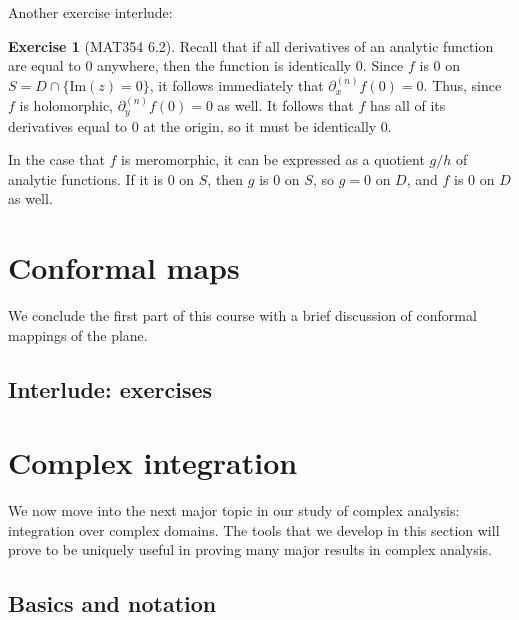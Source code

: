 \documentclass[aps,pra,showpacs,notitlepage,onecolumn,superscriptaddress,nofootinbib]{revtex4-1}
\theoremstyle{definition}
\newtheorem{exercise}{Exercise}[section]
\newcommand{\hhrulefill}{\hspace{-1.5em} \hrulefill}
\begin{document}
\noindent Another exercise interlude:

\hhrulefill

\begin{exercise}[MAT354 6.2]
  Recall that if all derivatives of an analytic function are equal to $0$ anywhere, then the function is identically $0$. Since $f$ is $0$ on $S = D \cap \{\text{Im}(z) = 0\}$,
  it follows immediately that $\partial_x^{(n)} f(0) = 0$. Thus, since $f$ is holomorphic, $\partial_y^{(n)} f(0) = 0$ as well. It follows that $f$ has all of its derivatives
  equal to $0$ at the origin, so it must be identically $0$.
  \newline

  \noindent In the case that $f$ is meromorphic, it can be expressed as a quotient $g/h$ of analytic functions. If it is $0$ on $S$, then $g$ is $0$ on $S$, so
  $g = 0$ on $D$, and $f$ is $0$ on $D$ as well.
  \end{exercise}

\hhrulefill

\section{Conformal maps}

\noindent We conclude the first part of this course with a brief discussion of conformal mappings of the plane.

\subsection{Interlude: exercises}


\section{Complex integration}

\noindent We now move into the next major topic in our study of complex analysis: integration over complex domains. The tools that we
develop in this section will prove to be uniquely useful in proving many major results in complex analysis.

\subsection{Basics and notation}
\end{document}

